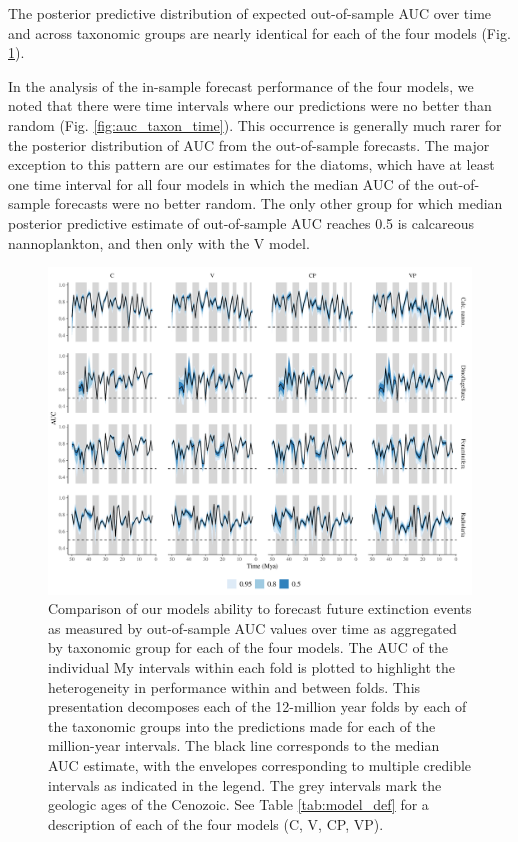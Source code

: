 \documentclass[12pt,letterpaper]{article}
\begin{document}
\begin{refsection}
The posterior predictive distribution of expected out-of-sample AUC over time and across taxonomic groups are nearly identical for each of the four models (Fig. \ref{fig:fold_auc_taxon_time}). 

In the analysis of the in-sample forecast performance of the four models, we noted that there were time intervals where our predictions were no better than random (Fig. \ref{fig:auc_taxon_time}). This occurrence is generally much rarer for the posterior distribution of AUC from the out-of-sample forecasts. The major exception to this pattern are our estimates for the diatoms, which have at least one time interval for all four models in which the median AUC of the out-of-sample forecasts were no better random. The only other group for which median posterior predictive estimate of out-of-sample AUC reaches 0.5 is calcareous nannoplankton, and then only with the V model.
\begin{figure}[ht]
 \centering
 \includegraphics[width=\textwidth,height=0.5\textheight,keepaspectratio=true]{../results/figure/fold_auc_taxon_time_full}
 \caption{Comparison of our models ability to forecast future extinction events as measured by out-of-sample AUC values over time as aggregated by taxonomic group for each of the four models. The AUC of the individual My intervals within each fold is plotted to highlight the heterogeneity in performance within and between folds. This presentation decomposes each of the 12-million year folds by each of the taxonomic groups into the predictions made for each of the million-year intervals. The black line corresponds to the median AUC estimate, with the envelopes corresponding to multiple credible intervals as indicated in the legend. The grey intervals mark the geologic ages of the Cenozoic. See Table \ref{tab:model_def} for a description of each of the four models (C, V, CP, VP).}
 \label{fig:fold_auc_taxon_time}
\end{figure}



\end{refsection}
\end{document}
